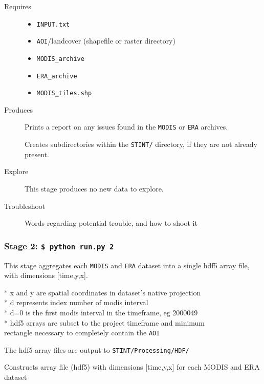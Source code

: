 \documentclass[twoside,a4paper]{refart}
\begin{document}
  \begin{description}
    \item [Requires]
      \begin{itemize}
        \item
          \texttt{INPUT.txt}
        \item
          \texttt{AOI}/landcover (shapefile or raster directory)
        \item
          \texttt{MODIS\_archive}
        \item
          \texttt{ERA\_archive}
        \item
          \texttt{MODIS\_tiles.shp}
\\
      \end{itemize}
  
  
    \item [Produces]
      Prints a report on any issues found in the 
      \texttt{MODIS} or \texttt{ERA} archives.
      
      Creates subdirectories within the \texttt{STINT/} directory, 
      if they are not already present.
      

    \item [Explore]
      This stage produces no new data to explore.

    \item [Troubleshoot]
      Words regarding potential trouble, and how to shoot it
  \end{description}
  
\subsubsection{\textbf{Stage 2:} \texttt{\$ python run.py 2}}
This stage aggregates each \texttt{MODIS} and \texttt{ERA} dataset into
a single hdf5 array file, with dimensions [time,y,x]. 

        * x and y are spatial coordinates in dataset's native projection\\
        * d represents index number of modis interval\\
        * d=0 is the first modis interval in the timeframe, eg 2000049\\
        * hdf5 arrays are subset to the project timeframe and minimum\\
          rectangle necessary to completely contain the \texttt{AOI}

The hdf5 array files are output to \texttt{STINT/Processing/HDF/}

Constructs array file (hdf5) with dimensions [time,y,x] for each
        MODIS and ERA dataset
\end{document}
